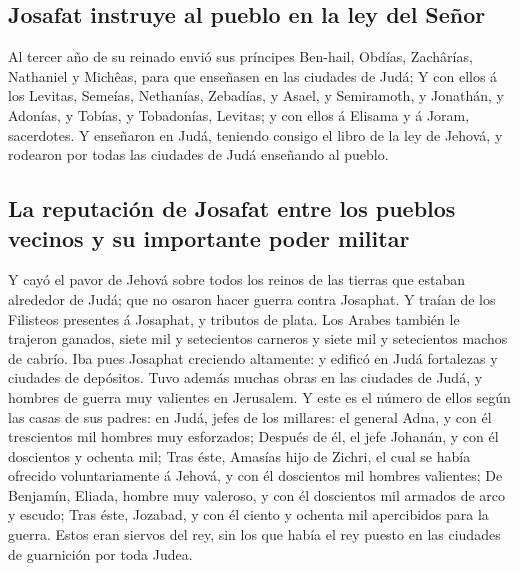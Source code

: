 \hypertarget{josafat-instruye-al-pueblo-en-la-ley-del-seuxf1or}{%
\subsection{Josafat instruye al pueblo en la ley del
Señor}\label{josafat-instruye-al-pueblo-en-la-ley-del-seuxf1or}}

 Al tercer año de su reinado envió sus príncipes Ben-hail,
Obdías, Zachârías, Nathaniel y Michêas, para que enseñasen en las
ciudades de Judá;  Y con ellos á los Levitas, Semeías,
Nethanías, Zebadías, y Asael, y Semiramoth, y Jonathán, y Adonías, y
Tobías, y Tobadonías, Levitas; y con ellos á Elisama y á Joram,
sacerdotes.  Y enseñaron en Judá, teniendo consigo el
libro de la ley de Jehová, y rodearon por todas las ciudades de Judá
enseñando al pueblo.

\hypertarget{la-reputaciuxf3n-de-josafat-entre-los-pueblos-vecinos-y-su-importante-poder-militar}{%
\subsection{La reputación de Josafat entre los pueblos vecinos y su
importante poder
militar}\label{la-reputaciuxf3n-de-josafat-entre-los-pueblos-vecinos-y-su-importante-poder-militar}}

 Y cayó el pavor de Jehová sobre todos los reinos de las
tierras que estaban alrededor de Judá; que no osaron hacer guerra contra
Josaphat.  Y traían de los Filisteos presentes á
Josaphat, y tributos de plata. Los Arabes también le trajeron ganados,
siete mil y setecientos carneros y siete mil y setecientos machos de
cabrío.  Iba pues Josaphat creciendo altamente: y edificó
en Judá fortalezas y ciudades de depósitos.  Tuvo además
muchas obras en las ciudades de Judá, y hombres de guerra muy valientes
en Jerusalem.  Y este es el número de ellos según las
casas de sus padres: en Judá, jefes de los millares: el general Adna, y
con él trescientos mil hombres muy esforzados;  Después
de él, el jefe Johanán, y con él doscientos y ochenta mil;
 Tras éste, Amasías hijo de Zichri, el cual se había
ofrecido voluntariamente á Jehová, y con él doscientos mil hombres
valientes;  De Benjamín, Eliada, hombre muy valeroso, y
con él doscientos mil armados de arco y escudo;  Tras
éste, Jozabad, y con él ciento y ochenta mil apercibidos para la guerra.
 Estos eran siervos del rey, sin los que había el rey
puesto en las ciudades de guarnición por toda Judea.

